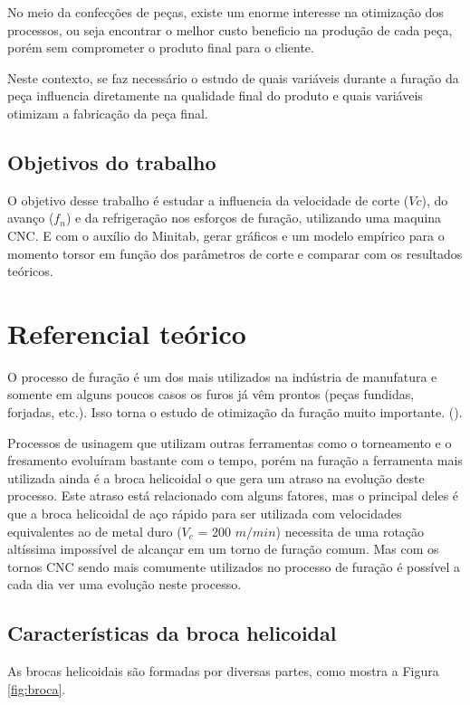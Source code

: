\documentclass[deposito, acronym, symbols]{fei}
\begin{document}
No meio da confecções de peças, existe um enorme interesse na otimização dos processos, ou seja encontrar o melhor custo beneficio na produção de cada peça, porém sem comprometer o produto final para o cliente.

Neste contexto, se faz necessário o estudo de quais variáveis durante a furação da peça influencia diretamente na qualidade final do produto e quais variáveis otimizam a fabricação da peça final.


\section{Objetivos do trabalho}

O objetivo desse trabalho é estudar a influencia da velocidade de corte ($Vc$), do avanço ($f_n$)  e da refrigeração nos esforços de furação, utilizando uma maquina CNC. E com o auxílio do Minitab, gerar gráficos e um modelo empírico para o momento torsor em função dos parâmetros de corte e comparar com os resultados teóricos.

\chapter{Referencial teórico}

O processo de furação é um dos mais utilizados na indústria de manufatura e somente em alguns poucos casos os furos já vêm prontos (peças fundidas, forjadas, etc.). Isso torna o estudo de otimização da furação muito importante. (\textcite{diniz2002tecmat}).

Processos de usinagem que utilizam outras ferramentas como o torneamento e o fresamento evoluíram bastante com o tempo, porém na furação a ferramenta mais utilizada ainda é a broca helicoidal o que gera um atraso na evolução deste processo. Este atraso está relacionado com alguns fatores, mas o principal deles é que a broca helicoidal de aço rápido para ser utilizada com velocidades equivalentes ao de metal duro ($V_c$ = 200 $m/min$) necessita de uma rotação altíssima impossível de alcançar em um torno de furação comum. Mas com os tornos CNC sendo mais comumente utilizados no processo de furação é possível a cada dia ver uma evolução neste processo.  

\section{Características da broca helicoidal}

As brocas helicoidais são formadas por diversas partes, como mostra a Figura \ref{fig:broca}.
\end{document}
